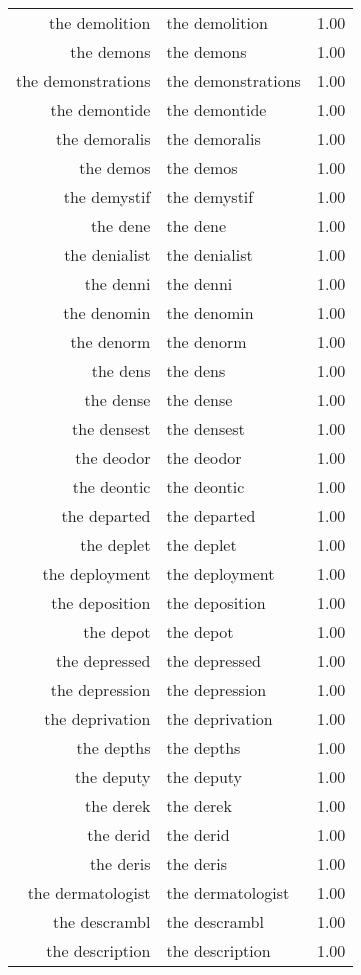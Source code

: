 \begin{table}[ht]
\begin{tabular}{rlr}
  the demolition & the demolition & 1.00 \\ 
  the demons & the demons & 1.00 \\ 
  the demonstrations & the demonstrations & 1.00 \\ 
  the demontide & the demontide & 1.00 \\ 
  the demoralis & the demoralis & 1.00 \\ 
  the demos & the demos & 1.00 \\ 
  the demystif & the demystif & 1.00 \\ 
  the dene & the dene & 1.00 \\ 
  the denialist & the denialist & 1.00 \\ 
  the denni & the denni & 1.00 \\ 
  the denomin & the denomin & 1.00 \\ 
  the denorm & the denorm & 1.00 \\ 
  the dens & the dens & 1.00 \\ 
  the dense & the dense & 1.00 \\ 
  the densest & the densest & 1.00 \\ 
  the deodor & the deodor & 1.00 \\ 
  the deontic & the deontic & 1.00 \\ 
  the departed & the departed & 1.00 \\ 
  the deplet & the deplet & 1.00 \\ 
  the deployment & the deployment & 1.00 \\ 
  the deposition & the deposition & 1.00 \\ 
  the depot & the depot & 1.00 \\ 
  the depressed & the depressed & 1.00 \\ 
  the depression & the depression & 1.00 \\ 
  the deprivation & the deprivation & 1.00 \\ 
  the depths & the depths & 1.00 \\ 
  the deputy & the deputy & 1.00 \\ 
  the derek & the derek & 1.00 \\ 
  the derid & the derid & 1.00 \\ 
  the deris & the deris & 1.00 \\ 
  the dermatologist & the dermatologist & 1.00 \\ 
  the descrambl & the descrambl & 1.00 \\ 
  the description & the description & 1.00 \\ 

\end{tabular}
\end{table}

